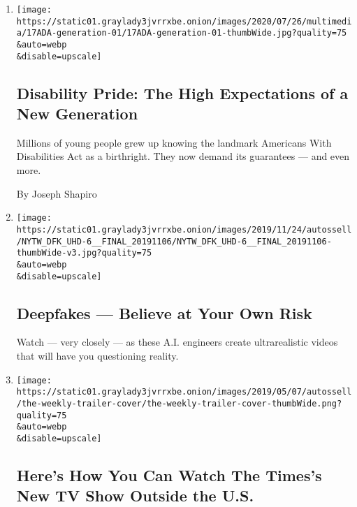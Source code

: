 \begin{enumerate}
\def\labelenumi{\arabic{enumi}.}
\item
  \href{/2020/07/17/style/americans-with-disabilities-act.html}{}

  \texttt{[image: https://static01.graylady3jvrrxbe.onion/images/2020/07/26/multimedia/17ADA-generation-01/17ADA-generation-01-thumbWide.jpg?quality=75\\\&auto=webp\\\&disable=upscale]}

  \hypertarget{disability-pride-the-high-expectations-of-a-new-generation}{%
  \subsection{Disability Pride: The High Expectations of a New
  Generation}\label{disability-pride-the-high-expectations-of-a-new-generation}}

  Millions of young people grew up knowing the landmark Americans With
  Disabilities Act as a birthright. They now demand its guarantees ---
  and even more.

  By Joseph Shapiro
\item
  \href{/2019/11/22/the-weekly/deepfake-joe-rogan.html}{}

  \texttt{[image: https://static01.graylady3jvrrxbe.onion/images/2019/11/24/autossell/NYTW\_DFK\_UHD-6\_\_FINAL\_20191106/NYTW\_DFK\_UHD-6\_\_FINAL\_20191106-thumbWide-v3.jpg?quality=75\\\&auto=webp\\\&disable=upscale]}

  \hypertarget{deepfakes--believe-at-your-own-risk}{%
  \subsection{Deepfakes --- Believe at Your Own
  Risk}\label{deepfakes--believe-at-your-own-risk}}

  Watch --- very closely --- as these A.I. engineers create
  ultrarealistic videos that will have you questioning reality.
\item
  \href{/2019/11/17/the-weekly/the-weekly-outside-the-us.html}{}

  \texttt{[image: https://static01.graylady3jvrrxbe.onion/images/2019/05/07/autossell/the-weekly-trailer-cover/the-weekly-trailer-cover-thumbWide.png?quality=75\\\&auto=webp\\\&disable=upscale]}

  \hypertarget{heres-how-you-can-watch-the-timess-new-tv-show-outside-the-us}{%
  \subsection{Here's How You Can Watch The Times's New TV Show Outside
  the
  U.S.}\label{heres-how-you-can-watch-the-timess-new-tv-show-outside-the-us}}


\end{enumerate}
